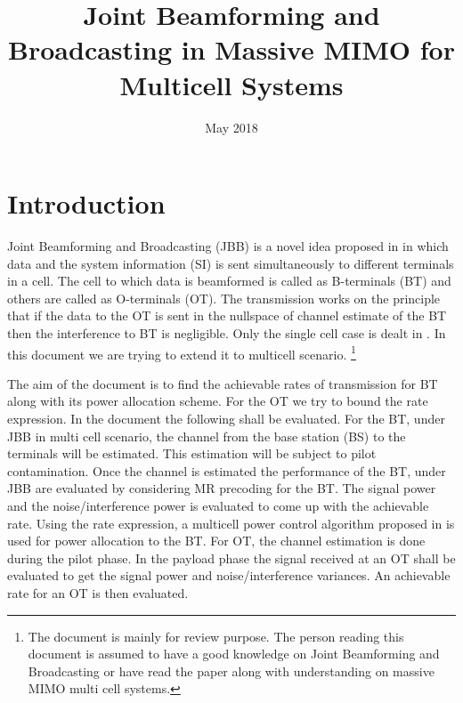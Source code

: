 \documentclass[10pt, a4paper, twoside,fleqn]{article}
\title{Joint Beamforming and Broadcasting in Massive MIMO for Multicell Systems}
\author{}
\date{May 2018}
\begin{document}
\maketitle
 
\section{Introduction}
	Joint Beamforming and Broadcasting (JBB) is a novel idea proposed in \cite{bib:jbb} in which data and the system information (SI) is sent simultaneously to different terminals in a cell. The cell to which data is beamformed is called as B-terminals (BT) and others are called as O-terminals (OT). The transmission works on the principle that if the data to the OT is sent in the nullspace of channel estimate of the BT then the interference to BT is negligible. Only the single cell case is dealt in \cite{bib:jbb}. In this document we are trying to extend it to multicell scenario.
\footnote{The document is mainly for review purpose. The person reading this document is assumed to have a good knowledge on Joint Beamforming and Broadcasting or have read the paper \cite{bib:jbb} along with understanding on massive MIMO multi cell systems.}
	
	The aim of the document is to find the achievable rates of transmission for BT along with its power allocation scheme. For the OT we try to bound the rate expression. In the document the following shall be evaluated. For the BT, under JBB in multi cell scenario, the channel from the base station (BS) to the terminals will be estimated. This estimation will be subject to pilot contamination. Once the channel is estimated the performance of the BT, under JBB are evaluated by considering MR precoding for the BT. The signal power and the noise/interference power is evaluated to come up with the achievable rate. Using the rate expression, a multicell power control algorithm proposed in \cite{bib:MassiveMimoBook} is used for power allocation to the BT.
     For OT, the channel estimation is done during the pilot phase. In the payload phase the signal received at an OT shall be evaluated to get the signal power and noise/interference variances. An achievable rate for an OT is then evaluated.
\end{document}
